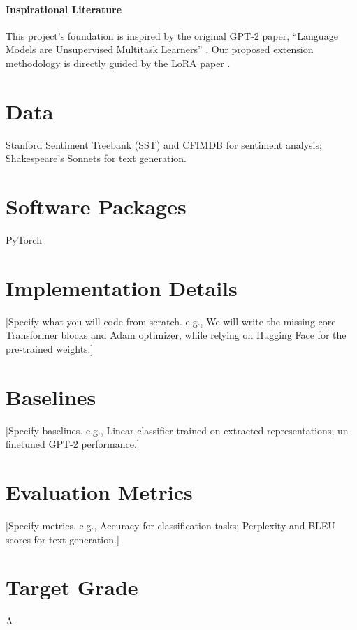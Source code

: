\documentclass{article}
\begin{document}
\paragraph{Inspirational Literature} 
This project’s foundation is inspired by the original GPT-2 paper, ``Language Models are Unsupervised Multitask Learners'' \cite{radford2019gpt2}. Our proposed extension methodology is directly guided by the LoRA paper \cite{hu2021lora}.


\section{Data}
Stanford Sentiment Treebank (SST) and CFIMDB for sentiment analysis; Shakespeare's Sonnets for text generation.

\section{Software Packages}
PyTorch

\section{Implementation Details}
[Specify what you will code from scratch. e.g., We will write the missing core Transformer blocks and Adam optimizer, while relying on Hugging Face for the pre-trained weights.]

\section{Baselines}
[Specify baselines. e.g., Linear classifier trained on extracted representations; un-finetuned GPT-2 performance.]

\section{Evaluation Metrics}
[Specify metrics. e.g., Accuracy for classification tasks; Perplexity and BLEU scores for text generation.]

\section{Target Grade}
A
\end{document}
